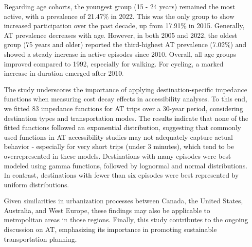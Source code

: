 \documentclass[preprint, 3p,
authoryear]{elsarticle} %
\begin{document}
Regarding age cohorts, the youngest group (15 - 24 years) remained the
most active, with a prevalence of 21.47\% in 2022. This was the only
group to show increased participation over the past decade, up from
17.91\% in 2015. Generally, AT prevalence decreases with age. However,
in both 2005 and 2022, the oldest group (75 years and older) reported
the third-highest AT prevalence (7.02\%) and showed a steady increase in
active episodes since 2010. Overall, all age groups improved compared to
1992, especially for walking. For cycling, a marked increase in duration
emerged after 2010.

The study underscores the importance of applying destination-specific
impedance functions when measuring cost decay effects in accessibility
analyses. To this end, we fitted 83 impedance functions for AT trips
over a 30-year period, considering destination types and transportation
modes. The results indicate that none of the fitted functions followed
an exponential distribution, suggesting that commonly used functions in
AT accessibility studies may not adequately capture actual behavior -
especially for very short trips (under 3 minutes), which tend to be
overrepresented in these models. Destinations with many episodes were
best modeled using gamma functions, followed by lognormal and normal
distributions. In contrast, destinations with fewer than six episodes
were best represented by uniform distributions.

Given similarities in urbanization processes between Canada, the United
States, Australia, and West Europe, these findings may also be
applicable to metropolitan areas in those regions. Finally, this study
contributes to the ongoing discussion on AT, emphasizing its importance
in promoting sustainable transportation planning.

\renewcommand\refname{References}

\end{document}
